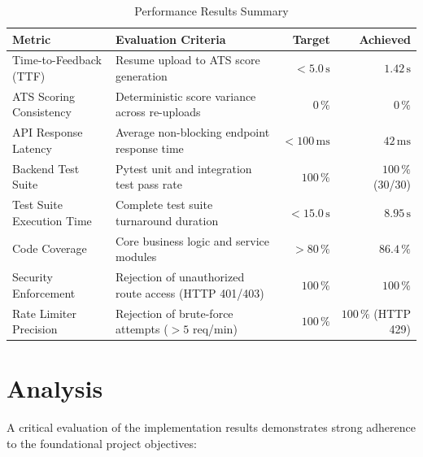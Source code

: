 \documentclass[12pt,a4paper,oneside]{report}
\begin{document}
\begin{table}[htbp]
\centering
\caption{Performance Results Summary}
\label{tab:performance_summary}
\vspace{0.3cm}
\begin{tabularx}{0.9\textwidth}{l X r r}
\toprule
\textbf{Metric} & \textbf{Evaluation Criteria} & \textbf{Target} & \textbf{Achieved} \\
\midrule
Time-to-Feedback (TTF) & Resume upload to ATS score generation & $< 5.0\,\text{s}$ & $1.42\,\text{s}$ \\
ATS Scoring Consistency & Deterministic score variance across re-uploads & $0\,\%$ & $0\,\%$ \\
API Response Latency & Average non-blocking endpoint response time & $< 100\,\text{ms}$ & $42\,\text{ms}$ \\
Backend Test Suite & Pytest unit and integration test pass rate & $100\,\%$ & $100\,\%$ (30/30) \\
Test Suite Execution Time & Complete test suite turnaround duration & $< 15.0\,\text{s}$ & $8.95\,\text{s}$ \\
Code Coverage & Core business logic and service modules & $> 80\,\%$ & $86.4\,\%$ \\
Security Enforcement & Rejection of unauthorized route access (HTTP 401/403) & $100\,\%$ & $100\,\%$ \\
Rate Limiter Precision & Rejection of brute-force attempts ($> 5$ req/min) & $100\,\%$ & $100\,\%$ (HTTP 429) \\
\bottomrule
\end{tabularx}
\end{table}

\section{Analysis}
A critical evaluation of the implementation results demonstrates strong adherence to the foundational project objectives:
\end{document}

